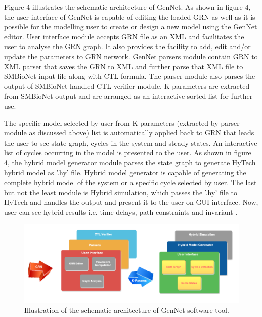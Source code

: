 \documentclass[twocolumn]{bmcart}%
\begin{document}
      
Figure 4 illustrates the schematic architecture of GenNet. As shown in figure 4, the user interface of GenNet is capable of editing the loaded GRN as well as it is possible for the modelling user to create or design a new model using the GenNet editor. User interface module accepts GRN file as an XML and facilitates the user to analyse the GRN graph. It also provides the facility to add, edit and/or update the parameters to GRN network. GenNet parsers module contain GRN to XML parser that saves the GRN to XML and further parse that XML file to SMBioNet input file along with CTL formula. The parser module also parses the output of SMBioNet handled CTL verifier module. K-parameters are extracted from SMBioNet output and are arranged as an interactive sorted list for further use.
\par The specific model selected by user from K-parameters (extracted by parser module as discussed above) list is automatically applied back to GRN that leads the user to see state graph, cycles in the system and steady states. An interactive list of cycles occurring in the model is presented to the user. As shown in figure 4, the hybrid model generator module parses the state graph to generate HyTech hybrid model as '.hy' file. Hybrid model generator is capable of generating the complete hybrid model of the system or a specific cycle selected by user. The last but not the least module is Hybrid simulation, which passes the '.hy' file to HyTech and handles the output and present it to the user on GUI interface. Now, user can see hybrid results i.e. time delays, path constraints and invariant .  
\begin{figure}[!ht] 
  \includegraphics{figures/Arch.pdf}
  \caption{
      Illustration of the schematic architecture of GenNet software tool.}
   
      \end{figure} 
\end{document}
